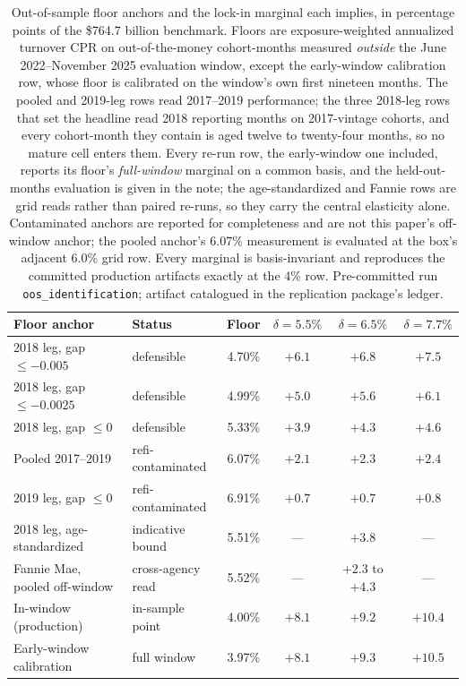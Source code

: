 \begin{table}[!t]
\centering
\footnotesize
\begin{threeparttable}
\caption{Out-of-sample floor anchors and the lock-in marginal each implies, in percentage points of the \$764.7 billion benchmark. Floors are exposure-weighted annualized turnover CPR on out-of-the-money cohort-months measured \emph{outside} the June 2022--November 2025 evaluation window, except the early-window calibration row, whose floor is calibrated on the window's own first nineteen months. The pooled and 2019-leg rows read 2017--2019 performance; the three 2018-leg rows that set the headline read 2018 reporting months on 2017-vintage cohorts, and every cohort-month they contain is aged twelve to twenty-four months, so no mature cell enters them. Every re-run row, the early-window one included, reports its floor's \emph{full-window} marginal on a common basis, and the held-out-months evaluation is given in the note; the age-standardized and Fannie rows are grid reads rather than paired re-runs, so they carry the central elasticity alone. Contaminated anchors are reported for completeness and are not this paper's off-window anchor; the pooled anchor's 6.07\% measurement is evaluated at the box's adjacent 6.0\% grid row. Every marginal is basis-invariant and reproduces the committed production artifacts exactly at the 4\% row. Pre-committed run \texttt{oos\_identification}; artifact catalogued in the replication package's ledger.}
\label{tab:oosfloor}
\begin{tabular}{llcccc}
\toprule
Floor anchor & Status & Floor & $\delta = 5.5\%$ & $\delta = 6.5\%$ & $\delta = 7.7\%$ \\
\midrule
2018 leg, gap $\leq -0.005$ & defensible & 4.70\% & $+6.1$ & $+6.8$ & $+7.5$ \\
2018 leg, gap $\leq -0.0025$ & defensible & 4.99\% & $+5.0$ & $+5.6$ & $+6.1$ \\
2018 leg, gap $\leq 0$ & defensible & 5.33\% & $+3.9$ & $+4.3$ & $+4.6$ \\
\midrule
Pooled 2017--2019 & refi-contaminated & 6.07\% & $+2.1$ & $+2.3$ & $+2.4$ \\
2019 leg, gap $\leq 0$ & refi-contaminated & 6.91\% & $+0.7$ & $+0.7$ & $+0.8$ \\
\midrule
2018 leg, age-standardized & indicative bound\tnote{b} & 5.51\% & --- & $+3.8$ & --- \\
Fannie Mae, pooled off-window & cross-agency read\tnote{c} & 5.52\% & --- & $+2.3$ to $+4.3$ & --- \\
\midrule
In-window (production) & in-sample point & 4.00\% & $+8.1$ & $+9.2$ & $+10.4$ \\
Early-window calibration & full window\tnote{a} & 3.97\% & $+8.1$ & $+9.3$ & $+10.5$ \\
\bottomrule
\end{tabular}
\end{threeparttable}
\end{table}

